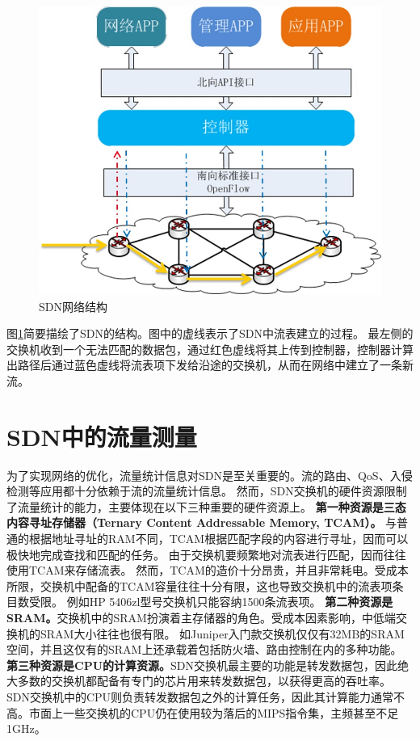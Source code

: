 \begin{figure}[ht]
	\centering
	\includegraphics[width=0.8\linewidth]{fig/sdn.jpg}
	\caption{SDN网络结构}\label{fig:sdn}
\end{figure}

图\ref{fig:sdn}简要描绘了SDN的结构。图中的虚线表示了SDN中流表建立的过程。
最左侧的交换机收到一个无法匹配的数据包，通过红色虚线将其上传到控制器，控制器计算出路径后通过蓝色虚线将流表项下发给沿途的交换机，从而在网络中建立了一条新流。

\section{SDN中的流量测量}\label{sec:measurement}
为了实现网络的优化，流量统计信息对SDN是至关重要的。流的路由、QoS、入侵检测等应用都十分依赖于流的流量统计信息。
然而，SDN交换机的硬件资源限制了流量统计的能力，主要体现在以下三种重要的硬件资源上。
\textbf{第一种资源是三态内容寻址存储器（Ternary Content Addressable Memory, TCAM）。}
与普通的根据地址寻址的RAM不同，TCAM根据匹配字段的内容进行寻址，因而可以极快地完成查找和匹配的任务。
由于交换机要频繁地对流表进行匹配，因而往往使用TCAM来存储流表。
然而，TCAM的造价十分昂贵，并且非常耗电。受成本所限，交换机中配备的TCAM容量往往十分有限，这也导致交换机中的流表项条目数受限。
例如HP 5406zl型号交换机只能容纳1500条流表项\cite{curtis2011devoflow}。
\textbf{第二种资源是SRAM。}交换机中的SRAM扮演着主存储器的角色。受成本因素影响，中低端交换机的SRAM大小往往也很有限。
如Juniper入门款交换机仅仅有32MB的SRAM空间\cite{ResourceMonitoring}，并且这仅有的SRAM上还承载着包括防火墙、路由控制在内的多种功能。
\textbf{第三种资源是CPU的计算资源。}SDN交换机最主要的功能是转发数据包，因此绝大多数的交换机都配备有专门的芯片用来转发数据包，以获得更高的吞吐率。
SDN交换机中的CPU则负责转发数据包之外的计算任务，因此其计算能力通常不高。市面上一些交换机的CPU仍在使用较为落后的MIPS指令集，主频甚至不足1GHz\cite{wang2014scotch}。

